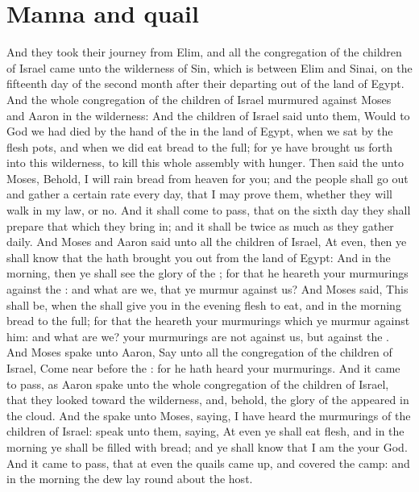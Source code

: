 \section*{Manna and quail}
\begin{biblechapter} %
\verse And they took their journey from Elim, and all the congregation of the children of Israel came unto the wilderness of Sin, which is between Elim and Sinai, on the fifteenth day of the second month after their departing out of the land of Egypt.
\verse And the whole congregation of the children of Israel murmured against Moses and Aaron in the wilderness:
\verse And the children of Israel said unto them, Would to God we had died by the hand of the \LORD in the land of Egypt, when we sat by the flesh pots, and when we did eat bread to the full; for ye have brought us forth into this wilderness, to kill this whole assembly with hunger.
\verse Then said the \LORD unto Moses, Behold, I will rain bread from heaven for you; and the people shall go out and gather a certain rate every day, that I may prove them, whether they will walk in my law, or no.
\verse And it shall come to pass, that on the sixth day they shall prepare that which they bring in; and it shall be twice as much as they gather daily.
\verse And Moses and Aaron said unto all the children of Israel, At even, then ye shall know that the \LORD hath brought you out from the land of Egypt:
\verse And in the morning, then ye shall see the glory of the \LORD; for that he heareth your murmurings against the \LORD: and what are we, that ye murmur against us?
\verse And Moses said, This shall be, when the \LORD shall give you in the evening flesh to eat, and in the morning bread to the full; for that the \LORD heareth your murmurings which ye murmur against him: and what are we? your murmurings are not against us, but against the \LORD.
\verse And Moses spake unto Aaron, Say unto all the congregation of the children of Israel, Come near before the \LORD: for he hath heard your murmurings.
\verse And it came to pass, as Aaron spake unto the whole congregation of the children of Israel, that they looked toward the wilderness, and, behold, the glory of the \LORD appeared in the cloud.
\verse And the \LORD spake unto Moses, saying,
\verse I have heard the murmurings of the children of Israel: speak unto them, saying, At even ye shall eat flesh, and in the morning ye shall be filled with bread; and ye shall know that I am the \LORD your God.
\verse And it came to pass, that at even the quails came up, and covered the camp: and in the morning the dew lay round about the host.

\end{biblechapter}

